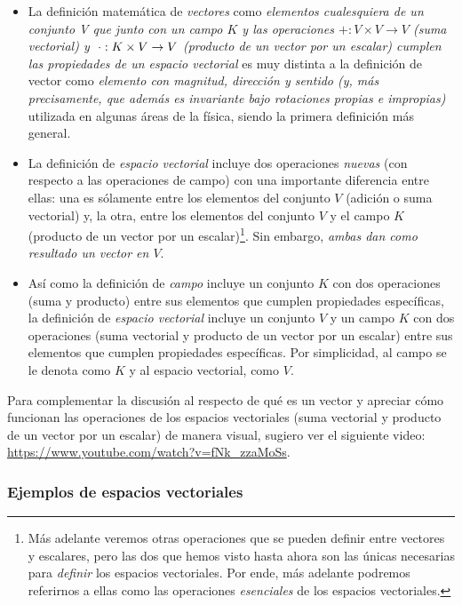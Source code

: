 \documentclass[12pt]{article}
\begin{document}
\begin{itemize}
    \item La definición matemática de \textit{vectores} como \textit{elementos cualesquiera de un conjunto V que \textemdash junto con un campo $K$ y las operaciones $+:V\times V\to V$ (suma vectorial) y $\hspace{1mm} \cdot:K\times V\to V$ (producto de un vector por un escalar) \textemdash\hspace{0.5mm} cumplen las propiedades de un espacio vectorial} es muy distinta a la definición de vector como \textit{elemento con magnitud, dirección y sentido (y, más precisamente, que además es invariante bajo rotaciones propias e impropias)} utilizada en algunas áreas de la física, siendo la primera definición más general.
    \item La definición de \textit{espacio vectorial} incluye dos operaciones \textit{nuevas} (con respecto a las operaciones de campo) con una importante diferencia entre ellas: una es sólamente entre los elementos del conjunto $V$ (adición o suma vectorial) y, la otra, entre los elementos del conjunto $V$ y el campo $K$ (producto de un vector por un escalar)\footnote{Más adelante veremos otras operaciones que se pueden definir entre vectores y escalares, pero las dos que hemos visto hasta ahora son las únicas necesarias para \textit{definir} los espacios vectoriales. Por ende, más adelante podremos referirnos a ellas como las operaciones \emph{esenciales} de los espacios vectoriales.}. Sin embargo, \emph{ambas dan como resultado un vector en $V$}.
    \item Así como la definición de \textit{campo} incluye un conjunto $K$ con dos operaciones (suma y producto) entre sus elementos que cumplen propiedades específicas, la definición de \textit{espacio vectorial} incluye un conjunto $V$ y un campo $K$ con dos operaciones (suma vectorial y producto de un vector por un escalar) entre sus elementos que cumplen propiedades específicas. Por simplicidad, al campo se le denota como $K$ y al espacio vectorial, como $V$.
    
\end{itemize}{}

Para complementar la discusión al respecto de qué es un vector y apreciar cómo funcionan las operaciones de los espacios vectoriales (suma vectorial y producto de un vector por un escalar) de manera visual, sugiero ver el siguiente video: \url{https://www.youtube.com/watch?v=fNk_zzaMoSs}.

\subsubsection{Ejemplos de espacios vectoriales} \label{Ejem:Espacios_vectoriales}
\end{document}

